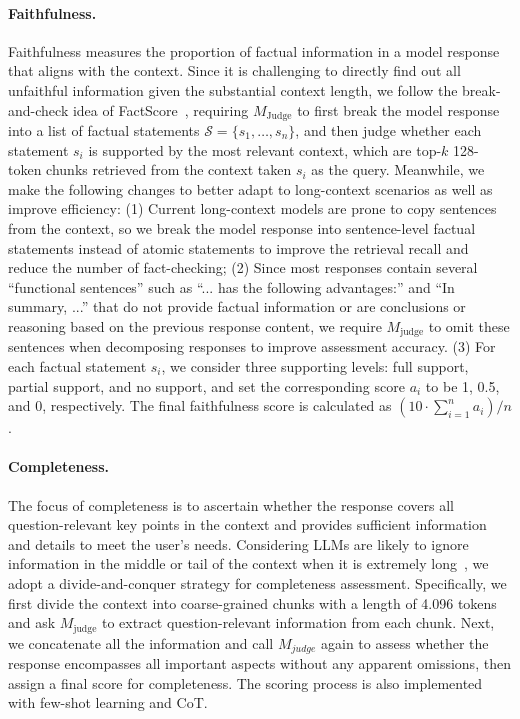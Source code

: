 \paragraph{Faithfulness.} Faithfulness measures the proportion of factual information in a model response that aligns with the context. Since it is challenging to directly find out all unfaithful information given the substantial context length, we follow the break-and-check idea of FactScore~\cite{factscore}, requiring  $M_\text{Judge}$ to first break the model response into a list of factual statements $\mathcal{S}=\{s_1, \dots, s_n\}$, and then judge whether each statement $s_i$ is supported by the most relevant context, which are top-$k$ 128-token chunks retrieved from the context taken $s_i$ as the query. Meanwhile, we make the following changes to better adapt to long-context scenarios as well as improve efficiency: (1) Current long-context models are prone to copy sentences from the context, so we break the model response into sentence-level factual statements instead of atomic statements to improve the retrieval recall and reduce the number of fact-checking; (2) Since most responses contain several ``functional sentences'' such as ``... has the following advantages:'' and ``In summary, ...'' that do not provide factual information or are conclusions or reasoning based on the previous response content, we require $M_\text{judge}$ to omit these sentences when decomposing responses to improve assessment accuracy. (3) For each factual statement $s_i$, we consider three supporting levels: full support, partial support, and no support, and set the corresponding score $a_i$ to be 1, 0.5, and 0, respectively. The final faithfulness score is calculated as $(10\cdot \sum_{i=1}^n a_i) / n$.

\paragraph{Completeness.} The focus of completeness is to ascertain whether the response covers all question-relevant key points in the context and provides sufficient information and details to meet the user's needs. Considering LLMs are likely to ignore information in the middle or tail of the context when it is extremely long~\cite{lostinmiddle, longcite}, we adopt a divide-and-conquer strategy for completeness assessment. Specifically, we first divide the context into coarse-grained chunks with a length of 4.096 tokens and ask $M_\text{judge}$ to extract question-relevant information from each chunk. Next, we concatenate all the information and call $M_{judge}$ again to assess whether the response encompasses all important aspects without any apparent omissions, then assign a final score for completeness. The scoring process is also implemented with few-shot learning and CoT.

